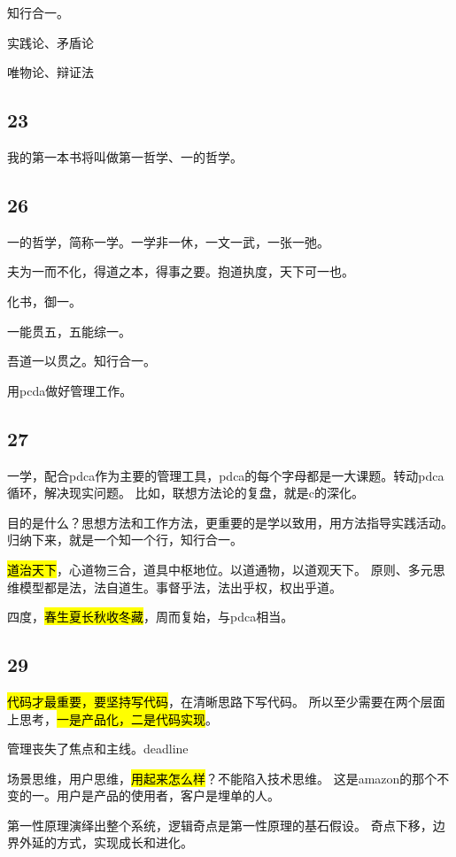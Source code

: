 知行合一。

实践论、矛盾论

唯物论、辩证法

\subsection{23}

我的第一本书将叫做第一哲学、一的哲学。

\subsection{26}

一的哲学，简称一学。一学非一休，一文一武，一张一弛。

夫为一而不化，得道之本，得事之要。抱道执度，天下可一也。

化书，御一。

一能贯五，五能综一。

吾道一以贯之。知行合一。

用pcda做好管理工作。

\subsection{27}

一学，配合pdca作为主要的管理工具，pdca的每个字母都是一大课题。转动pdca循环，解决现实问题。
比如，联想方法论的复盘，就是c的深化。

目的是什么？思想方法和工作方法，更重要的是学以致用，用方法指导实践活动。
归纳下来，就是一个知一个行，知行合一。

\hl{道治天下}，心道物三合，道具中枢地位。以道通物，以道观天下。
原则、多元思维模型都是法，法自道生。事督乎法，法出乎权，权出乎道。

四度，\hl{春生夏长秋收冬藏}，周而复始，与pdca相当。

\subsection{29}

\hl{代码才最重要，要坚持写代码}，在清晰思路下写代码。
所以至少需要在两个层面上思考，\hl{一是产品化，二是代码实现}。

管理丧失了焦点和主线。deadline

场景思维，用户思维，\hl{用起来怎么样}？不能陷入技术思维。
这是amazon的那个不变的一。用户是产品的使用者，客户是埋单的人。

第一性原理演绎出整个系统，逻辑奇点是第一性原理的基石假设。
奇点下移，边界外延的方式，实现成长和进化。

